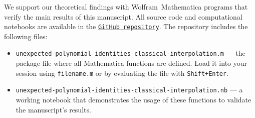 We support our theoretical findings with Wolfram~Mathematica programs that verify the main results of this manuscript.
All source code and computational notebooks are available in the
\href{https://github.com/kolosovpetro/surprising-polynomial-identities-classical-interpolation}
{\texttt{GitHub repository}}.
The repository includes the following files:
\begin{itemize}
    \item \texttt{unexpected-polynomial-identities-classical-interpolation.m} --- the package file where
    all Mathematica functions are defined.
    Load it into your session using \texttt{filename.m} or by evaluating the file with \texttt{Shift+Enter}.
    \item \texttt{unexpected-polynomial-identities-classical-interpolation.nb} --- a working notebook that demonstrates
    the usage of these functions to validate the manuscript’s results.
\end{itemize}

